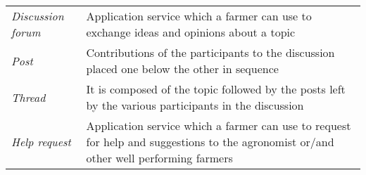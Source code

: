 \begin{center}
\begin{longtable}{|m{3.2cm}|m{8.3cm}|}
\textit{Discussion forum} & Application service which a farmer can use to exchange ideas and opinions about a topic\\
\textit{Post} & Contributions of the participants to the discussion placed one below the other in sequence\\
\textit{Thread} & It is composed of the topic followed by the posts left by the various participants in the discussion\\
\textit{Help request} & Application service which a farmer can use to request for help and suggestions to the agronomist or/and other well performing farmers\\
\hline
\end{longtable}
\end{center}